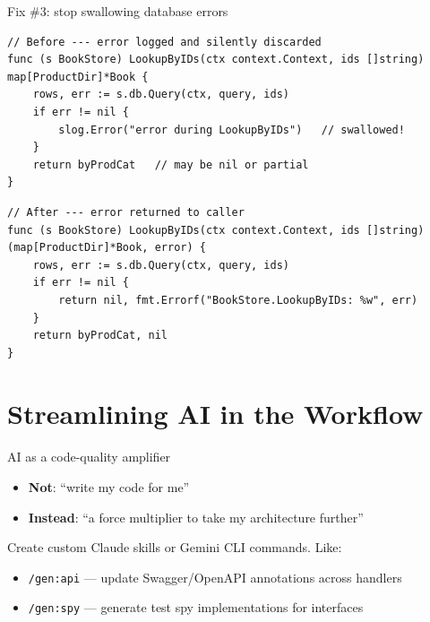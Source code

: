 \documentclass[aspectratio=169,11pt]{beamer}
\begin{document}
\begin{frame}[fragile]{Fix \#3: stop swallowing database errors}
\begin{lstlisting}
// Before --- error logged and silently discarded
func (s BookStore) LookupByIDs(ctx context.Context, ids []string) map[ProductDir]*Book {
	rows, err := s.db.Query(ctx, query, ids)
	if err != nil {
		slog.Error("error during LookupByIDs")   // swallowed!
	}
	return byProdCat   // may be nil or partial
}
\end{lstlisting}
\begin{lstlisting}
// After --- error returned to caller
func (s BookStore) LookupByIDs(ctx context.Context, ids []string) (map[ProductDir]*Book, error) {
	rows, err := s.db.Query(ctx, query, ids)
	if err != nil {
		return nil, fmt.Errorf("BookStore.LookupByIDs: %w", err)
	}
	return byProdCat, nil
}
\end{lstlisting}
\end{frame}

\section{Streamlining AI in the Workflow}

\begin{frame}{AI as a code-quality amplifier}
  \begin{itemize}
    \setlength\itemsep{6pt}
    \item \textbf{Not}: ``write my code for me''
    \item \textbf{Instead}: ``a force multiplier to take my architecture further''
  \end{itemize}

  \vspace{8pt}
  Create custom Claude skills or Gemini CLI commands. Like:
  \begin{itemize}
    \setlength\itemsep{4pt}
    \item \texttt{/gen:api} --- update Swagger/OpenAPI annotations across handlers
    \item \texttt{/gen:spy} --- generate test spy implementations for interfaces
  \end{itemize}
\end{frame}
\end{document}
